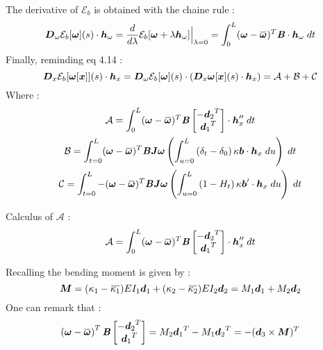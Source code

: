 The derivative of $\mathcal{E}_b$ is obtained with the chaine rule :
\begin{equation}
	\pdiffof{\omega}{\mathcal{E}_b[\vect{\omega}]}{s}{\vect{h}_\omega}
		= \frac{d}{d\lambda} \mathcal{E}_b[\vect{\omega} + \lambda \vect{h}_\omega]\Bigr|_{\lambda = 0}
		= \int_{0}^{L} (\vect{\omega} - \overbar{\vect{\omega}})^T \mat{B} \cdot \vect{h}_\omega \;dt
\end{equation}
Finally, reminding eq 4.14 :
\begin{equation}
	\boldsymbol{D}_x\mathcal{E}_b[\boldsymbol{\omega}[\boldsymbol{x}]](s)\cdot\boldsymbol{h}_x
	= \boldsymbol{D}_\omega\mathcal{E}_b[\boldsymbol{\omega}](s)\cdot(\boldsymbol{D}_x\boldsymbol{\omega}[\boldsymbol{x}](s)\cdot\boldsymbol{h}_x)
	= \mathcal{A} +\mathcal{B}+\mathcal{C}
\end{equation}
Where :
\begin{subequations}
	\begin{gather}
	\mathcal{A} = \int_{0}^{L} (\vect{\omega} - \overbar{\vect{\omega}})^T \mat{B}
	\begin{bmatrix}
		-{\vect{d}_2}^T\\
		{\vect{d}_1}^T\\
	\end{bmatrix}\cdot \vect{h}_x'' \;dt \\
	\mathcal{B} =
	\int_{t=0}^{L} (\vect{\omega} - \overbar{\vect{\omega}})^T \mat{B}\mat{J}\vect{\omega}
	\left(\int_{u=0}^L \left(\delta_t-\delta_0\right)\kappa\vect{b}\cdot  \vect{h}_x \;du\right)
	\;dt\\
	\mathcal{C} =
	\int_{t=0}^{L} -(\vect{\omega} - \overbar{\vect{\omega}})^T \mat{B}\mat{J}\vect{\omega}
	\left(\int_{u=0}^L \left(1-H_t\right)\kappa\vect{b}'\cdot  \vect{h}_x \;du\right)
	\;dt
	\end{gather}
\end{subequations}

Calculus of $\mathcal{A}$ :
\begin{equation}
	\mathcal{A}
	= \int_{0}^{L} (\vect{\omega} - \overbar{\vect{\omega}})^T \mat{B}
		\begin{bmatrix}
			-{\vect{d}_2}^T\\
			{\vect{d}_1}^T\\
		\end{bmatrix}\cdot \vect{h}_x'' \;dt \\
\end{equation}

Recalling the bending moment is given by :
\begin{equation}
	\vect{M}
	= (\kappa_1 - \overbar{\kappa_1})EI_1\vect{d}_1 + (\kappa_2 - \overbar{\kappa_2})EI_2\vect{d}_2
	= M_1\vect{d}_1 + M_2\vect{d}_2
\end{equation}
One can remark that :
\begin{equation}
	\left(\vect{\omega} - \overbar{\vect{\omega}}\right)^T \mat{B}
		\begin{bmatrix}
			-{\vect{d}_2}^T\\
			{\vect{d}_1}^T\\
		\end{bmatrix}
	=  M_2{\vect{d}_1}^T - M_1{\vect{d}_2}^T
	= - ({\vect{d}_3} \times \vect{M})^T
\end{equation}

